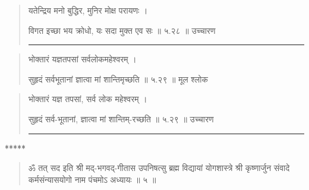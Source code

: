 \begin{quotation}

यतेन्द्रिय मनो बुद्धिर, मुनिर मोक्ष परायणः  ।  

विगत इच्छा भय क्रोधो, यः सदा मुक्त एव सः  ॥ ५.२८ ॥  उच्चारण

\noindent\rule{16cm}{0.4pt} 
\end{quotation}


\begin{quotation}  

भोक्तारं यज्ञतपसां सर्वलोकमहेश्वरम्‌  ।  

सुहृदं सर्वभूतानां ज्ञात्वा मां शान्तिमृच्छति  ॥ ५.२९ ॥  मूल श्लोक
\end{quotation}

\begin{quotation}
भोक्तारं यज्ञ तपसां, सर्व लोक महेश्वरम्‌  ।  

सुहृदं सर्व-भूतानां, ज्ञात्वा मां शान्तिम्-रच्छति  ॥ ५.२९ ॥  उच्चारण

\noindent\rule{16cm}{0.4pt} 
\end{quotation}

\begin{center} ***** \end{center}

\begin{quotation}  


ॐ तत् सद इति श्री मद्-भगवद्-गीतास उपनिषत्सु ब्रह्म विद्यायां योगशास्त्रे श्री कृष्णार्जुन संवादे कर्मसंन्यासयोगो नाम पंचमोऽ अध्यायः  ॥  ५  ॥ 


\end{quotation}


